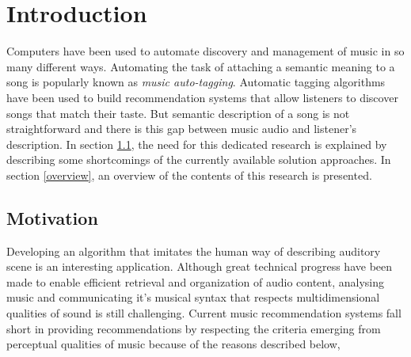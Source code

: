 

\chapter{Introduction} %

\label{Chapter1} %


\newcommand{\keyword}[1]{\textbf{#1}}
\newcommand{\tabhead}[1]{\textbf{#1}}
\newcommand{\code}[1]{\texttt{#1}}
\newcommand{\file}[1]{\texttt{\bfseries#1}}
\newcommand{\option}[1]{\texttt{\itshape#1}}



Computers have been used to automate discovery and management of music in so many different ways. Automating the task of attaching a semantic meaning to a song is popularly known as \textit{music auto-tagging}. Automatic tagging algorithms have been used to build recommendation systems that allow listeners to discover songs that match their taste. But semantic description of a song is not straightforward and there is this gap between music audio and listener's description. In section \ref{motivation}, the need for this dedicated research is explained by describing some shortcomings of the currently available solution approaches. In section \ref{overview}, an overview of the contents of this research is presented.   


\section{Motivation}
\label{motivation}
Developing an algorithm that imitates the human way of describing auditory scene is an interesting application. Although great technical progress have been made to enable efficient retrieval and organization of audio content, analysing music and communicating it's musical syntax that respects multidimensional qualities of sound is still challenging. Current music recommendation systems fall short in providing recommendations by respecting the criteria emerging from perceptual qualities of music because of the reasons described below,
  
